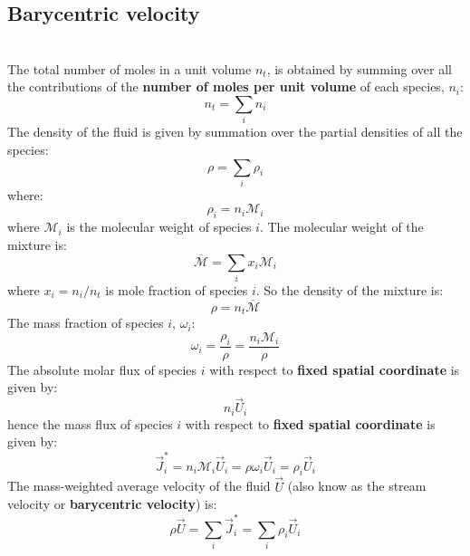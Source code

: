 \subsection{Barycentric velocity}

\\

\noindent
The total number of moles in a unit volume $n_t$, is obtained by summing over all the contributions of the \textbf{number of moles per unit volume} of each species, $n_i$:
\begin{equation}
n_t = \sum_i n_i
\end{equation}
The density of the fluid is given by summation over the partial densities of all the species:
\begin{equation}
\rho = \sum_i \rho_i
\end{equation}
where:
\begin{equation}
\rho_i = n_i \mathcal{M}_i
\end{equation}
where $\mathcal{M}_i$ is the molecular weight of species $i$.  The molecular weight of the mixture is:
\begin{equation}
\overline{\mathcal{M}} = \sum_i x_i \mathcal{M}_i
\end{equation}
where $x_i=n_i/n_t$ is mole fraction of species $i$.  So the density of the mixture is:
\begin{equation}
\rho = n_t \overline{\mathcal{M}}
\end{equation}
The mass fraction of species $i$, $\omega_i$:
\begin{equation}
\omega_i = \frac{\rho_i}{\rho} = \frac{n_i \mathcal{M}_i}{\rho}
\label{eq:rhoi}
\end{equation}
The absolute molar flux of species $i$ with respect to \textbf{fixed spatial coordinate} is given by:
\begin{equation}
n_i \vec{U}_i
\end{equation}
hence the mass flux of species $i$ with respect to \textbf{fixed spatial coordinate} is given by:
\begin{equation}
\vec{J}^\ast_i = n_i \mathcal{M}_i \vec{U}_i = \rho \omega_i \vec{U}_i = \rho_i \vec{U}_i
\label{eq:Jast}
\end{equation}
The mass-weighted average velocity of the fluid $\vec{U}$ (also know as the stream velocity or \textbf{barycentric velocity}) is:
\begin{equation}
\rho \vec{U} = \sum_i \vec{J}^\ast_i = \sum_i \rho_i \vec{U}_i
\end{equation}
